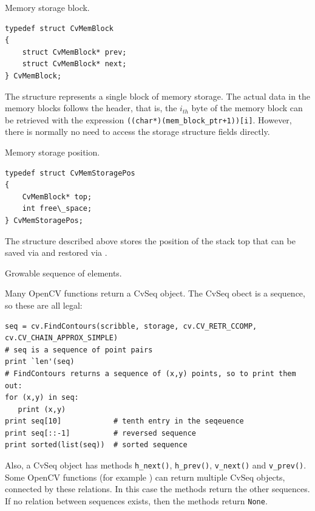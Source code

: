 \label{CvMemBlock}
Memory storage block.

\begin{lstlisting}
typedef struct CvMemBlock
{
    struct CvMemBlock* prev;
    struct CvMemBlock* next;
} CvMemBlock;
\end{lstlisting}

The structure  represents a single block of memory
storage. The actual data in the memory blocks follows the header, that is,
the $i_{th}$ byte of the memory block can be retrieved with the expression
\texttt{((char*)(mem\_block\_ptr+1))[i]}. However, there is normally no need
to access the storage structure fields directly.

\label{CvMemStoragePos}
Memory storage position.

\begin{lstlisting}
typedef struct CvMemStoragePos
{
    CvMemBlock* top;
    int free\_space;
} CvMemStoragePos;
\end{lstlisting}

The structure described above stores the position of the stack top that can be saved via  and restored via .

\fi

\label{CvSeq}
Growable sequence of elements.

\ifPy
Many OpenCV functions return a CvSeq object.  The CvSeq obect is a sequence, so these are all legal:
\begin{lstlisting}
seq = cv.FindContours(scribble, storage, cv.CV_RETR_CCOMP, cv.CV_CHAIN_APPROX_SIMPLE)
# seq is a sequence of point pairs
print `len'(seq)
# FindContours returns a sequence of (x,y) points, so to print them out:
for (x,y) in seq:
   print (x,y)
print seq[10]            # tenth entry in the seqeuence
print seq[::-1]          # reversed sequence
print sorted(list(seq))  # sorted sequence
\end{lstlisting}

Also, a CvSeq object has methods
\texttt{h\_next()},
\texttt{h\_prev()},
\texttt{v\_next()} and
\texttt{v\_prev()}.
Some OpenCV functions (for example ) can return multiple CvSeq objects, connected by these relations.
In this case the methods return the other sequences.  If no relation between sequences exists, then the methods return \texttt{None}.

\fi

